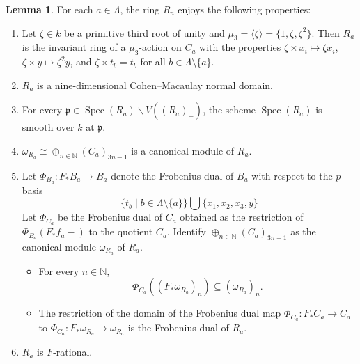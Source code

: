 \documentclass[reqno,11pt]{amsart}
\numberwithin{equation}{section}
\theoremstyle{definition}
\theoremstyle{definition}
\newtheorem{lemma}[theorem]{Lemma}
\theoremstyle{definition}
\theoremstyle{remark}
\newcommand{\Spec}{\operatorname{Spec}}
\newcommand{\NN}{\mathbb{N}}
\newcommand{\fp}{\mathfrak{p}}
\begin{document}
\begin{lemma}
    \label{lem: F rationality of Veronese general}
    For each $a\in \Lambda$, the ring $R_a$ enjoys the following properties:
    \begin{enumerate}[label=(\alph*)]
        \item\label{lem: F rationality of Veronese general group action} Let $\zeta\in k$ be a primitive third root of unity and $\mu_3=\langle\zeta\rangle = \{ 1,\zeta,\zeta^2\}$. Then $R_a$ is the invariant ring of a $\mu_3$-action on $C_a$ with the properties $\zeta\times x_i\mapsto \zeta x_i$, $\zeta\times y\mapsto \zeta^2y$, and $\zeta\times t_b = t_b$ for all $b\in\Lambda\setminus\{a\}$.
        \item\label{lem: F rationality of Veronese general CM and normal} $R_a$ is a nine-dimensional Cohen--Macaulay normal domain.
        \item\label{lem: F rationality of Veronese general SFR locus} For every $\fp\in \Spec(R_a)\smallsetminus V((R_a)_+)$, the scheme $\Spec(R_a)$ is smooth over $k$ at $\fp$.
        \item\label{lem: F rationality of Veronese general canonical module} $\omega_{R_a} \cong \oplus_{n\in\NN} (C_a)_{3n-1}$ is a canonical module of $R_a$. 
        \item\label{lem: F rationality of Veronese general restriction of Frobenius dual} Let $\Phi_{B_a}:F_*B_a\to B_a$ denote the Frobenius dual of $B_a$ with respect to the $p$-basis 
        \[
        \{t_b\mid b\in\Lambda\setminus\{a\}\}\bigcup\{x_1,x_2,x_3,y\}
        \]
        Let $\Phi_{C_a}$ be the Frobenius dual of $C_a$ obtained as the restriction of $\Phi_{B_a}(F_*f_a-)$ to the quotient $C_a$. Identify $\oplus_{n\in\NN} (C_a)_{3n-1}$ as the canonical module $\omega_{R_a}$ of $R_a$.
        \begin{itemize}
            \item For every $n\in\NN$, 
                \[
                \Phi_{C_a}((F_*\omega_{R_a})_n)\subseteq (\omega_{R_a})_n.
                \]
            \item The restriction of the domain of the Frobenius dual map $\Phi_{C_a}:F_*C_a\to C_a$ to $\Phi_{C_a}:F_*\omega_{R_a}\to \omega_{R_a}$ is the Frobenius dual of $R_a$.
        \end{itemize}
        \item\label{lem: F rationality of Veronese general F-rational} $R_a$ is $F$-rational.
    \end{enumerate}
\end{lemma}
\end{document}
